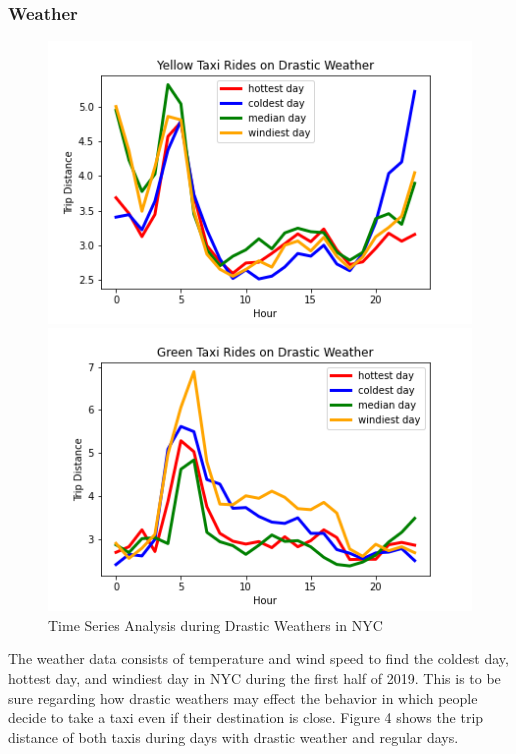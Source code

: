 \documentclass[11pt]{article}
\begin{document}
\subsubsection{Weather}
\begin{figure}[ht]
     \centering
     \begin{minipage}[b]{0.495\textwidth}
         \centering
         \includegraphics[width=\textwidth]{plots/yellow time series.png}
     \end{minipage}
     \hfill
     \begin{minipage}[b]{0.495\textwidth}
         \centering
         \includegraphics[width=\textwidth]{plots/green time series.png}
     \end{minipage}
     \hfill
     \caption{Time Series Analysis during Drastic Weathers in NYC}
\end{figure}
The weather data consists of temperature and wind speed to find the coldest day, hottest day, and windiest day in NYC during the first half of 2019. This is to be sure regarding how drastic weathers may effect the behavior in which people decide to take a taxi even if their destination is close. Figure 4 shows the trip distance of both taxis during days with drastic weather and regular days.
\end{document}
